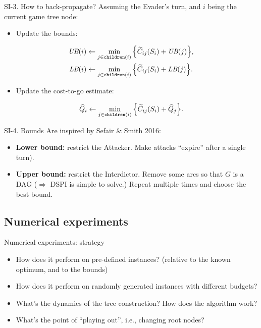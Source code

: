 \documentclass[10pt, xcolor=svgnames]{beamer}
\begin{document}
\begin{frame}[label={sec:org7634d99}]{SI-3. How to back-propagate?}
Assuming the Evader's turn, and \(i\) being the current game tree node:
\begin{itemize}
\item Update the bounds:
\end{itemize}
\begin{align*}
  \UB{i} &\gets \min_{j\in\children{i}} \Big\{ \widetilde{C}_{ij}(S_i) + \UB{j} \Big\},\\
  \LB{i} &\gets \min_{j\in\children{i}} \Big\{ \widetilde{C}_{ij}(S_i) + \LB{j} \Big\}.
\end{align*}

\begin{itemize}
\item Update the cost-to-go estimate:
\end{itemize}
\begin{equation*}
\widehat{Q}_i \gets \min_{j\in\texttt{children}(i)} \Big\{ \widetilde{C}_{ij}(S_i) + \widehat{Q}_j\Big\}.
\end{equation*}
\end{frame}
\begin{frame}[label={sec:orgcfda384}]{SI-4. Bounds}
Are inspired by Sefair \& Smith 2016:
\begin{itemize}
\item \textbf{Lower bound:} restrict the \alert{Attacker}. Make attacks ``expire'' after a single turn).
\item \textbf{Upper bound:} restrict the \alert{Interdictor}. Remove some arcs so that \(G\) is a DAG (\(\Rightarrow\) DSPI is simple to solve.) Repeat multiple times and choose the best bound.
\end{itemize}
\end{frame}
\subsection{Numerical experiments}
\label{sec:org1c46322}
\begin{frame}[label={sec:org155f1aa}]{Numerical experiments: strategy}
\begin{itemize}
\item How does it perform on pre-defined instances? (relative to the known optimum, and to the bounds)
\item How does it perform on randomly generated instances with different budgets?
\item What's the dynamics of the tree construction? How does the algorithm work?
\item What's the point of ``playing out'', i.e., changing root nodes?
\end{itemize}
\end{frame}
\end{document}
